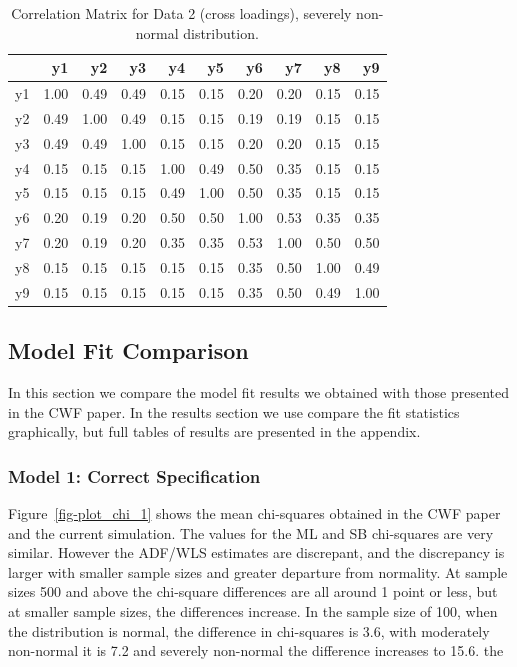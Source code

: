 \documentclass[
  letterpaper,
  DIV=11,
  numbers=noendperiod]{scrartcl}
\begin{document}
\begin{longtable}[]{@{}lrrrrrrrrr@{}}

\caption{\label{tbl-cors_data_6}Correlation Matrix for Data 2 (cross
loadings), severely non-normal distribution.}

\tabularnewline

\toprule\noalign{}
& y1 & y2 & y3 & y4 & y5 & y6 & y7 & y8 & y9 \\
\midrule\noalign{}
\endhead
\bottomrule\noalign{}
\endlastfoot
y1 & 1.00 & 0.49 & 0.49 & 0.15 & 0.15 & 0.20 & 0.20 & 0.15 & 0.15 \\
y2 & 0.49 & 1.00 & 0.49 & 0.15 & 0.15 & 0.19 & 0.19 & 0.15 & 0.15 \\
y3 & 0.49 & 0.49 & 1.00 & 0.15 & 0.15 & 0.20 & 0.20 & 0.15 & 0.15 \\
y4 & 0.15 & 0.15 & 0.15 & 1.00 & 0.49 & 0.50 & 0.35 & 0.15 & 0.15 \\
y5 & 0.15 & 0.15 & 0.15 & 0.49 & 1.00 & 0.50 & 0.35 & 0.15 & 0.15 \\
y6 & 0.20 & 0.19 & 0.20 & 0.50 & 0.50 & 1.00 & 0.53 & 0.35 & 0.35 \\
y7 & 0.20 & 0.19 & 0.20 & 0.35 & 0.35 & 0.53 & 1.00 & 0.50 & 0.50 \\
y8 & 0.15 & 0.15 & 0.15 & 0.15 & 0.15 & 0.35 & 0.50 & 1.00 & 0.49 \\
y9 & 0.15 & 0.15 & 0.15 & 0.15 & 0.15 & 0.35 & 0.50 & 0.49 & 1.00 \\

\end{longtable}

\subsection{Model Fit Comparison}\label{model-fit-comparison}

In this section we compare the model fit results we obtained with those
presented in the CWF paper. In the results section we use compare the
fit statistics graphically, but full tables of results are presented in
the appendix.

\subsubsection{Model 1: Correct
Specification}\label{model-1-correct-specification}

Figure~\ref{fig-plot_chi_1} shows the mean chi-squares obtained in the
CWF paper and the current simulation. The values for the ML and SB
chi-squares are very similar. However the ADF/WLS estimates are
discrepant, and the discrepancy is larger with smaller sample sizes and
greater departure from normality. At sample sizes 500 and above the
chi-square differences are all around 1 point or less, but at smaller
sample sizes, the differences increase. In the sample size of 100, when
the distribution is normal, the difference in chi-squares is 3.6, with
moderately non-normal it is 7.2 and severely non-normal the difference
increases to 15.6. the
\end{document}

